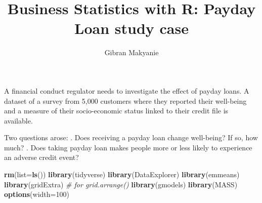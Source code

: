 \documentclass[]{article}
\title{Business Statistics with R: Payday Loan study case}
\author{Gibran Makyanie}
\date{}
\newenvironment{Shaded}{\begin{snugshade}}{\end{snugshade}}
\newcommand{\CommentTok}[1]{\textcolor[rgb]{0.56,0.35,0.01}{\textit{#1}}}
\newcommand{\DataTypeTok}[1]{\textcolor[rgb]{0.13,0.29,0.53}{#1}}
\newcommand{\DecValTok}[1]{\textcolor[rgb]{0.00,0.00,0.81}{#1}}
\newcommand{\KeywordTok}[1]{\textcolor[rgb]{0.13,0.29,0.53}{\textbf{#1}}}
\newcommand{\NormalTok}[1]{#1}
\newcommand{\OperatorTok}[1]{\textcolor[rgb]{0.81,0.36,0.00}{\textbf{#1}}}
\newcommand{\OtherTok}[1]{\textcolor[rgb]{0.56,0.35,0.01}{#1}}
\newcommand{\StringTok}[1]{\textcolor[rgb]{0.31,0.60,0.02}{#1}}
\begin{document}
\maketitle

{
\setcounter{tocdepth}{3}
\tableofcontents
}
A financial conduct regulator needs to investigate the effect of payday
loans. A dataset of a survey from 5,000 customers where they reported
their well-being and a measure of their socio-economic status linked to
their credit file is available.

Two questions arose: . Does receiving a payday loan change
well-being? If so, how much? . Does taking payday loan makes people
more or less likely to experience an adverse credit event?

\begin{Shaded}
\begin{Highlighting}[]
\KeywordTok{rm}\NormalTok{(}\DataTypeTok{list=}\KeywordTok{ls}\NormalTok{())}
\KeywordTok{library}\NormalTok{(tidyverse)}
\KeywordTok{library}\NormalTok{(DataExplorer)}
\KeywordTok{library}\NormalTok{(emmeans)}
\KeywordTok{library}\NormalTok{(gridExtra) }\CommentTok{# for grid.arrange()}
\KeywordTok{library}\NormalTok{(gmodels)}
\KeywordTok{library}\NormalTok{(MASS)}
\KeywordTok{options}\NormalTok{(}\DataTypeTok{width=}\DecValTok{100}\NormalTok{)}
\end{Highlighting}
\end{Shaded}

\begin{Shaded}
\end{Shaded}
\end{document}
